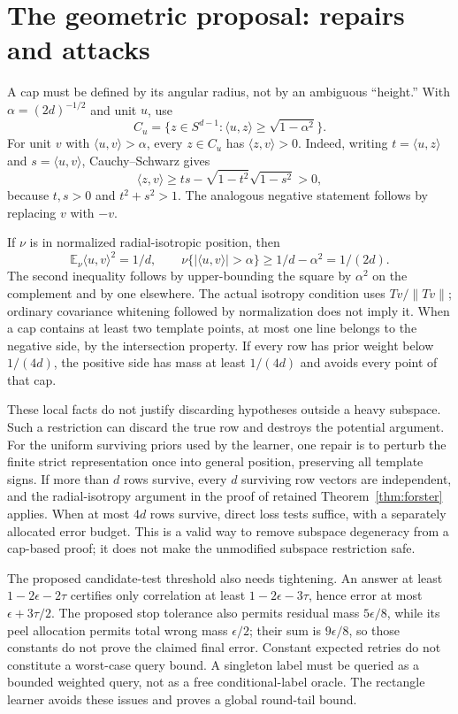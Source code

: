 \documentclass[11pt]{article}
\newcommand{\E}{\mathbb E}
\newcommand{\1}{\mathbf 1}
\begin{document}
\section{The geometric proposal: repairs and attacks}\label{sec:cap}
A cap must be defined by its angular radius, not by an ambiguous ``height.'' With $\alpha=(2d)^{-1/2}$ and unit $u$, use
\[
 C_u=\{z\in S^{d-1}:\langle u,z\rangle\ge\sqrt{1-\alpha^2}\}.
\]
For unit $v$ with $\langle u,v\rangle>\alpha$, every $z\in C_u$ has $\langle z,v\rangle>0$. Indeed, writing $t=\langle u,z\rangle$ and $s=\langle u,v\rangle$, Cauchy--Schwarz gives
\[
 \langle z,v\rangle\ge ts-\sqrt{1-t^2}\sqrt{1-s^2}>0,
\]
because $t,s>0$ and $t^2+s^2>1$. The analogous negative statement follows by replacing $v$ with $-v$.

If $\nu$ is in normalized radial-isotropic position, then
\[
 \E_\nu\langle u,v\rangle^2=1/d,
 \qquad\nu\{|\langle u,v\rangle|>\alpha\}\ge1/d-\alpha^2=1/(2d).
\]
The second inequality follows by upper-bounding the square by $\alpha^2$ on the complement and by one elsewhere. The actual isotropy condition uses $Tv/\|Tv\|$; ordinary covariance whitening followed by normalization does not imply it. When a cap contains at least two template points, at most one line belongs to the negative side, by the intersection property. If every row has prior weight below $1/(4d)$, the positive side has mass at least $1/(4d)$ and avoids every point of that cap.

These local facts do not justify discarding hypotheses outside a heavy subspace. Such a restriction can discard the true row and destroys the potential argument. For the uniform surviving priors used by the learner, one repair is to perturb the finite strict representation once into general position, preserving all template signs. If more than $d$ rows survive, every $d$ surviving row vectors are independent, and the radial-isotropy argument in the proof of retained Theorem~\ref{thm:forster} applies. When at most $4d$ rows survive, direct loss tests suffice, with a separately allocated error budget. This is a valid way to remove subspace degeneracy from a cap-based proof; it does not make the unmodified subspace restriction safe.

The proposed candidate-test threshold also needs tightening. An answer at least $1-2\epsilon-2\tau$ certifies only correlation at least $1-2\epsilon-3\tau$, hence error at most $\epsilon+3\tau/2$. The proposed stop tolerance also permits residual mass $5\epsilon/8$, while its peel allocation permits total wrong mass $\epsilon/2$; their sum is $9\epsilon/8$, so those constants do not prove the claimed final error. Constant expected retries do not constitute a worst-case query bound. A singleton label must be queried as a bounded weighted query, not as a free conditional-label oracle. The rectangle learner avoids these issues and proves a global round-tail bound.
\end{document}
